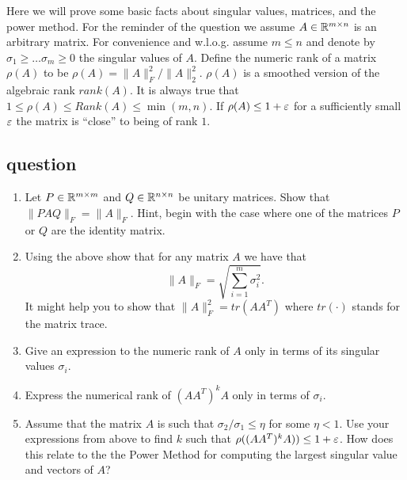 \documentclass{article}
\begin{document}
Here we will prove some basic facts about singular values, matrices, and the power method.
For the reminder of the question we assume $A \in {\mathbb{R}}^{m \times n}$ is an arbitrary matrix.
For convenience and w.l.o.g. assume $m \le n$ and denote by $\sigma_1 \ge \ldots \sigma_m \ge 0$
the singular values of $A$.
Define the numeric rank of a matrix $\rho(A)$ to be $\rho(A) = \|A\|^{2}_{F}/\|A\|^2_2$. $\rho(A)$ is a smoothed
version of the algebraic rank $rank(A)$. It is always true that $1\le \rho(A) \le Rank(A) \le \min(m,n)$.
If $\rho(A) \le 1 +\varepsilon$ for a sufficiently small $\varepsilon$ the matrix is ``close'' to being of rank $1$.

\subsection*{question}

\begin{enumerate}
\item Let $P \in {\mathbb{R}}^{m \times m}$ and $Q \in {\mathbb{R}}^{n \times n}$ be unitary matrices.
Show that $\|PAQ\|_{F} = \|A\|_{F}$.
Hint, begin with the case where one of the matrices $P$ or $Q$ are the identity matrix.
\item Using the above show that for any matrix $A$ we have that 
\[
\|A\|_{F} = \sqrt{\sum_{i=1}^{m}\sigma_{i}^{2}}.
\]
It might help you to show that $\|A\|^{2}_{F} = tr(AA^T)$ where $tr(\cdot)$ stands for the matrix trace.
\item Give an expression to the numeric rank of $A$ only in terms of its singular values $\sigma_i$. 
\item Express the numerical rank of $(AA^T)^{k}A$ only in terms of  $\sigma_i$.
\item Assume that the matrix $A$ is such that $\sigma_2/\sigma_1 \le \eta$ for some $\eta < 1$.
Use your expressions from above to find $k$ such that $\rho((AA^T)^{k}A)) \le  1+ \varepsilon$.
How does this relate to the the Power Method for computing the largest singular value and vectors of $A$?
\end{enumerate}



\pagebreak
\end{document}
